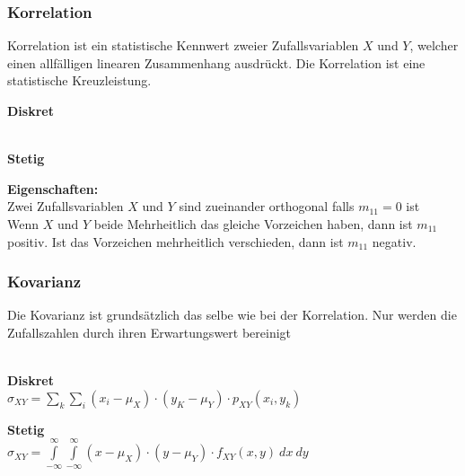 \subsubsection{Korrelation}
Korrelation ist ein statistische Kennwert zweier Zufallsvariablen $X$ und $Y$, welcher einen allfälligen linearen Zusammenhang ausdrückt. Die Korrelation ist eine statistische Kreuzleistung.\\
\begin{minipage}[t]{0.48\textwidth}
	\textbf{Diskret}\\
	\\
\end{minipage} \hspace{0.04\textwidth}
\begin{minipage}[t]{0.48\textwidth}
	\textbf{Stetig}\\
\end{minipage}
\textbf{Eigenschaften:}\\
Zwei Zufallsvariablen $X$ und $Y$ sind zueinander orthogonal falls $m_{11} = 0$ ist\\
Wenn $X$ und $Y$ beide Mehrheitlich das gleiche Vorzeichen haben, dann ist $m_{11}$ positiv. Ist das Vorzeichen mehrheitlich verschieden, dann ist $m_{11}$ negativ.
 
\subsubsection{Kovarianz}
Die Kovarianz ist grundsätzlich das selbe wie bei der Korrelation. Nur werden die Zufallszahlen durch ihren Erwartungswert bereinigt\\
\\[5pt]
\begin{minipage}[t]{0.48\textwidth}
	\textbf{Diskret}\\
	$\sigma_{XY} = \sum\limits_{k}\sum\limits_{i} (x_i-\mu_X)\cdot (y_K - \mu_Y)\cdot p_{XY}(x_i,y_k)$
\end{minipage} \hspace{0.04\textwidth}
\begin{minipage}[t]{0.48\textwidth}
	\textbf{Stetig}\\
	$\sigma_{XY} = \int\limits_{-\infty}^{\infty}\int\limits_{-\infty}^{\infty} (x-\mu_X)\cdot (y - \mu_Y)\cdot f_{XY}(x,y) \: dx \: dy$
\end{minipage}

